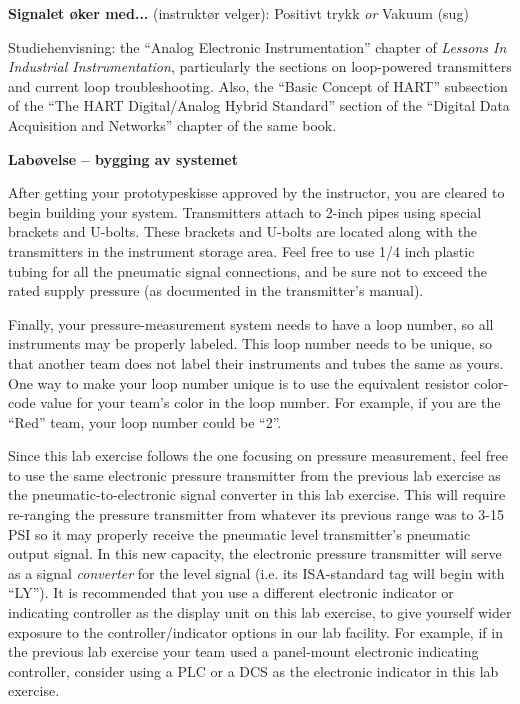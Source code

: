 \vskip 10pt

\noindent
{\bf Signalet øker med...} (instruktør velger): \hskip 20pt \underbar{\hskip 20pt} Positivt trykk \hskip 10pt {\it or} \hskip 10pt \underbar{\hskip 20pt} Vakuum (sug)

\vskip 10pt

\vfil

Studiehenvisning: the ``Analog Electronic Instrumentation'' chapter of {\it Lessons In Industrial Instrumentation}, particularly the sections on loop-powered transmitters and current loop troubleshooting.  Also, the ``Basic Concept of HART'' subsection of the ``The HART Digital/Analog Hybrid Standard'' section of the ``Digital Data Acquisition and Networks'' chapter of the same book.






\vfil \eject

\noindent
{\bf Labøvelse -- bygging av systemet}

\vskip 5pt

After getting your prototypeskisse approved by the instructor, you are cleared to begin building your system.  Transmitters attach to 2-inch pipes using special brackets and U-bolts.  These brackets and U-bolts are located along with the transmitters in the instrument storage area.  Feel free to use 1/4 inch plastic tubing for all the pneumatic signal connections, and be sure not to exceed the rated supply pressure (as documented in the transmitter's manual).

Finally, your pressure-measurement system needs to have a loop number, so all instruments may be properly labeled.  This loop number needs to be unique, so that another team does not label their instruments and tubes the same as yours.  One way to make your loop number unique is to use the equivalent resistor color-code value for your team's color in the loop number.  For example, if you are the ``Red'' team, your loop number could be ``2''. 

Since this lab exercise follows the one focusing on pressure measurement, feel free to use the same electronic pressure transmitter from the previous lab exercise as the pneumatic-to-electronic signal converter in this lab exercise.  This will require re-ranging the pressure transmitter from whatever its previous range was to 3-15 PSI so it may properly receive the pneumatic level transmitter's pneumatic output signal.  In this new capacity, the electronic pressure transmitter will serve as a signal {\it converter} for the level signal (i.e. its ISA-standard tag will begin with ``LY'').  It is recommended that you use a different electronic indicator or indicating controller as the display unit on this lab exercise, to give yourself wider exposure to the controller/indicator options in our lab facility.  For example, if in the previous lab exercise your team used a panel-mount electronic indicating controller, consider using a PLC or a DCS as the electronic indicator in this lab exercise.

